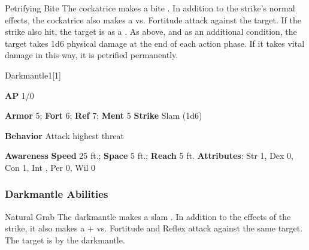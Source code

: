 \begin{freeability}{Petrifying Bite}
The cockatrice makes a bite .
In addition to the strike's normal effects, the cockatrice also makes a  vs. Fortitude attack against the target.
\hit If the strike also hit, the target is  as a .
\crit As above, and as an additional condition, the target takes 1d6 physical damage at the end of each action phase.
If it takes vital damage in this way, it is petrified permanently.
\end{freeability}

\begin{monsection}{Darkmantle}{1}[1]
\vspace{-1em}\vspace{-1em}
\begin{spellcontent}
\begin{spelltargetinginfo}
{\textbf{AP} 1/0}

\pari \textbf{Armor} 5;
\textbf{Fort} 6;
\textbf{Ref} 7;
\textbf{Ment} 5
\pari \textbf{Strike} Slam  (1d6)



\pari \textbf{Behavior} Attack highest threat
\end{spelltargetinginfo}
\end{spellcontent}

\begin{monsterfooter}
\pari \textbf{Awareness} 
\pari \textbf{Speed} 25 ft.;
\textbf{Space} 5 ft.;
\textbf{Reach} 5 ft.
\pari \textbf{Attributes}:
Str 1,
Dex 0,
Con 1,
Int ,
Per 0,
Wil 0
\end{monsterfooter}
\end{monsection}


\subsubsection{Darkmantle Abilities}

\begin{freeability}{Natural Grab}
The darkmantle makes a slam .
In addition to the effects of the strike, it also makes a + vs. Fortitude and Reflex attack against the same target.
\hit The target is  by the darkmantle.
\end{freeability}

